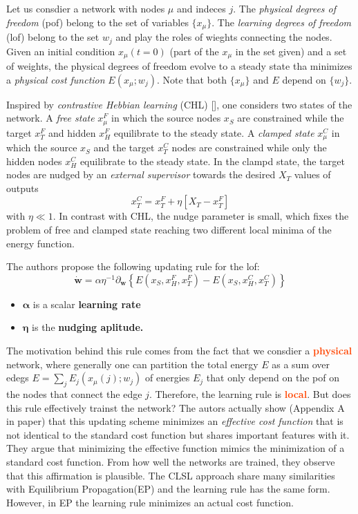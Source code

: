 \documentclass[11pt]{article}
\newcommand{\important}[1]{\textcolor{OrangeRed}{\bf{#1}}}
\begin{document}
Let us consdier a network with nodes $\mu$ and indeces $j$. The \textit{physical degrees of freedom} (pof) belong to the set of variables $\{ x_{\mu}\}$. The \textit{learning degrees of freedom} (lof) belong to the set $w_j$ and play the roles of wieghts connecting the nodes. Given an initial condition $x_{\mu}(t=0)$ (part of the $x_{\mu}$ in the set given) and a set of weights, the physical degrees of freedom evolve to a steady state tha minimizes a \textit{physical cost function} $E(x_{\mu};w_j)$. Note that both $\{ x_{\mu} \}$ and $E$ depend on $\{ w_j\}$.

Inspired by \textit{contrastive Hebbian learning} (CHL) [], one considers two states of the network. A \textit{free state} $x_{\mu}^{F}$ in which the source nodes $x_S$ are constrained while the target $x_T^F$ and hidden $x_H^F$ equilibrate to the steady state. A \textit{clamped state} $x_{\mu}^{C}$ in which the source $x_S$ and the target $x_T^C$ nodes are constrained while only the hidden nodes $x_H^C$ equilibrate to the steady state. In the clampd state, the target nodes are nudged by an \textit{external supervisor} towards the desired $X_T$ values of outputs
\[
x_T^{C} = x_{T}^F + \eta \left[ X_T - x_{T}^{F} \right] 
\] 
with $\eta \ll 1$. In contrast with CHL, the nudge parameter is small, which fixes the problem of free and clamped state reaching two different local minima of the energy function.

The authors propose the following updating rule for the lof:
\[
\dot{\mathbf{w}} = \alpha \eta^{-1} \partial_{\mathbf{w}} \left\{ E(x_S, x_{H}^{F}, x_{T}^{F}) - E(x_S, x_{H}^{C}, x_{T}^{C}) \right\}   
\]

\begin{itemize}
    \item $\boldsymbol{\alpha}$ is a scalar \bf{learning rate}
    \item $\boldsymbol{\eta}$ is the \bf{nudging aplitude}.
\end{itemize}

The motivation behind this rule comes from the fact that we consdier a \important{physical} network, where generally one can partition the total energy $E$ as a sum over edegs $E = \sum_{j}E_{j}(x_{\mu}(j);w_j)$ of energies $E_j$ that only depend on the pof on the nodes that connect the edge $j$. Therefore, the learning rule is \important{local}. But does this rule effectively trainst the network? The autors actually show (Appendix A in paper) that this updating scheme minimizes an \textit{effective cost function} that is not identical to the standard cost function but shares important features with it. They argue that minimizing the effective function mimics the minimization of a standard cost function. From how well the networks are trained, they observe that this affirmation is plausible. The CLSL approach share many similarities with Equilibrium Propagation(EP) \cite{} and the learning rule has the same form. However, in EP the learning rule minimizes an actual cost function.
\end{document}
